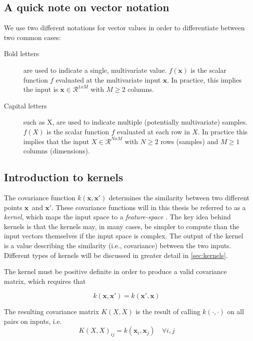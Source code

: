 \subsection{A quick note on vector notation}
We use two different notations for vector values in order to differentiate between two common cases:
\begin{description}
\item[Bold letters] are used to indicate a single, multivariate value. $f(\boldsymbol{x})$ is the scalar function $f$ evaluated at the multivariate input $\boldsymbol{x}$. In practice, this implies the input is $\boldsymbol{x} \in \mathcal{R}^{1 x M}$ with $M\geq 2$ columns.
\item[Capital letters] such as X, are used to indicate multiple (potentially multivariate) samples. $f(X)$ is the scalar function $f$ evaluated at each row in $X$. In practice this implies that the input $X \in \mathcal{R}^{N x M}$ with $N \geq 2$ rows (samples) and $M \geq 1$ columns (dimensions).
\end{description}

\subsection{Introduction to kernels}
The covariance function $k(\boldsymbol{x}, \boldsymbol{x}')$ determines the similarity between two different points $\boldsymbol{x}$ and $\boldsymbol{x}'$. These covariance functions will in this thesis be referred to as a \textit{kernel}, which maps the input space to a \textit{feature-space} \cite{rasmussen}. The key idea behind kernels is that the kernels may, in many cases, be simpler to compute than the input vectors themselves if the input space is complex. The output of the kernel is a value describing the similarity (i.e., covariance) between the two inputs. Different types of kernels will be discussed in greater detail in \cref{sec:kernels}.

The kernel must be positive definite in order to produce a valid covariance matrix, which requires that

\begin{equation}
    k(\boldsymbol{x}, \boldsymbol{x}') = k(\boldsymbol{x}', \boldsymbol{x})
\end{equation}

The resulting covariance matrix $K(X, X)$ is the result of calling $k(\cdot, \cdot)$ on all pairs on inputs, i.e.
\begin{equation}
    K(X, X)_{ij} = k(\boldsymbol{x}_i, \boldsymbol{x}_j) \quad \forall i, j
\end{equation}

